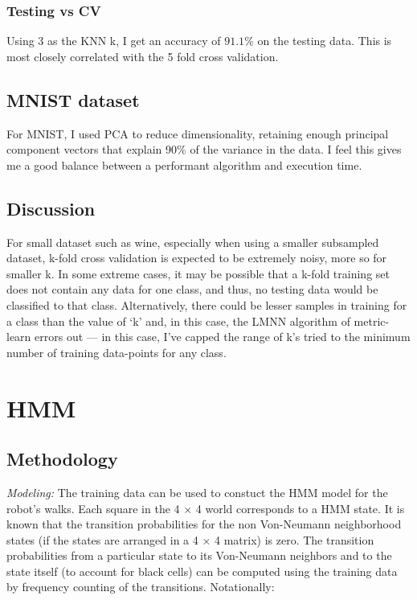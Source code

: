 \documentclass[5pt]{article}
\begin{document}
\subsubsection{Testing vs CV}
Using 3 as the KNN k, I get an accuracy of $91.1\%$ on the testing data. This
is most closely correlated with the 5 fold cross validation.

\subsection{MNIST dataset}
For MNIST, I used PCA to reduce dimensionality, retaining enough principal
component vectors that explain 90\% of the variance in the data. I feel this
gives me a good balance between a performant algorithm and execution time.

\subsection{Discussion}
For small dataset such as wine, especially when using a smaller subsampled
dataset, k-fold cross validation is expected to be extremely noisy, more so for
smaller k. In some extreme cases, it may be possible that a k-fold training set
does not contain any data for one class, and thus, no testing data would be
classified to that class. Alternatively, there could be lesser samples in
training for a class than the value of `k' and, in this case, the LMNN
algorithm of metric-learn errors out --- in this case, I've capped the range
of k's tried to the minimum number of training data-points for any class.

\section{HMM}
\subsection{Methodology}
\emph{Modeling:} The training data can be used to constuct the HMM model for
the robot's walks.  Each square in the 4 $\times$ 4 world corresponds to a HMM
state. It is known that the transition probabilities for the non Von-Neumann
neighborhood states (if the states are arranged in a 4 $\times$ 4 matrix) is
zero. The transition probabilities from a particular state to its Von-Neumann
neighbors and to the state itself (to account for black cells) can be computed
using the training data by frequency counting of the transitions. Notationally:
\end{document}
